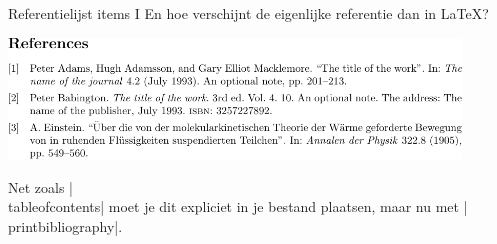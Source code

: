 
\begin{frame}{Referentielijst items I}
	En hoe verschijnt de eigenlijke referentie dan in \LaTeX?
	
	\begin{center}
		\includegraphics[width=0.9\textwidth]{assets/snippetReferences/snippetReferences.pdf}
	\end{center}
	
	Net zoals \hll|\\tableofcontents| moet je dit expliciet in je bestand plaatsen, maar nu met
	\hll|\\printbibliography|.
\end{frame}
